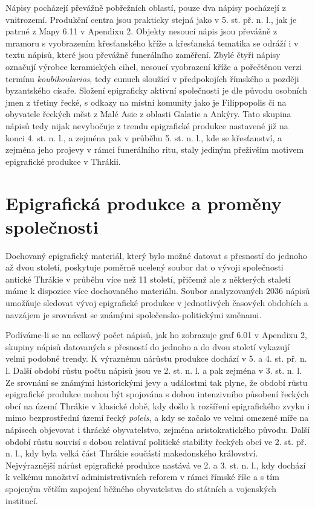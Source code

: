 Nápisy pocházejí převážně pobřežních oblastí, pouze dva nápisy pocházejí z vnitrozemí. Produkční centra jsou prakticky stejná jako v 5. st. př. n. l., jak je patrné z Mapy 6.11 v Apendixu 2. Objekty nesoucí nápis jsou převážně z mramoru s vyobrazením křesťanského kříže a křesťanská tematika se odráží i v textu nápisů, které jsou převážně funerálního zaměření. Zbylé čtyři nápisy označují výrobce keramických cihel, nesoucí vyobrazení kříže a pořečtěnou verzi termínu {\em koubikoularios}, tedy eunuch sloužící v předpokojích římského a později byzantského císaře. Složení epigraficky aktivní společnosti je dle původu osobních jmen z třetiny řecké, s odkazy na místní komunity jako je Filippopolis či na obyvatele řeckých měst z Malé Asie z oblasti Galatie a Ankýry. Tato skupina nápisů tedy nijak nevybočuje z trendu epigrafické produkce nastavené již na konci 4. st. n. l., a zejména pak v průběhu 5. st. n. l., kde se křesťanství, a zejména jeho projevy v rámci funerálního ritu, staly jediným přeživším motivem epigrafické produkce v Thrákii.

\section[epigrafická-produkce-a-proměny-společnosti]{Epigrafická produkce a proměny společnosti}

Dochovaný epigrafický materiál, který bylo možné datovat s přesností do jednoho až dvou století, poskytuje poměrně ucelený soubor dat o vývoji společnosti antické Thrákie v průběhu více než 11 století, přičemž ale z některých staletí máme k dispozice více dochovaného materiálu. Soubor analyzovaných 2036 nápisů umožňuje sledovat vývoj epigrafické produkce v jednotlivých časových obdobích a navzájem je srovnávat se známými společensko-politickými změnami.

Podíváme-li se na celkový počet nápisů, jak ho zobrazuje graf 6.01 v Apendixu 2, skupiny nápisů datovaných s přesností do jednoho a do dvou století vykazují velmi podobné trendy. K výraznému nárůstu produkce dochází v 5. a 4. st. př. n. l. Další období růstu počtu nápisů jsou ve 2. st. n. l. a pak zejména v 3. st. n. l. Ze srovnání se známými historickými jevy a událostmi tak plyne, že období růstu epigrafické produkce mohou být spojována s dobou intenzivního působení řeckých obcí na území Thrákie v klasické době, kdy došlo k rozšíření epigrafického zvyku i mimo bezprostřední území řecký {\em poleis}, a kdy se začalo ve velmi omezené míře na nápisech objevovat i thrácké obyvatelstvo, zejména aristokratického původu. Další období růstu souvisí s dobou relativní politické stability řeckých obcí ve 2. st. př. n. l., kdy byla velká část Thrákie součástí makedonského království. Nejvýraznější nárůst epigrafické produkce nastává ve 2. a 3. st. n. l., kdy dochází k velkému množství administrativních reforem v rámci římské říše a s tím spojeným větším zapojení běžného obyvatelstva do státních a vojenských institucí.

